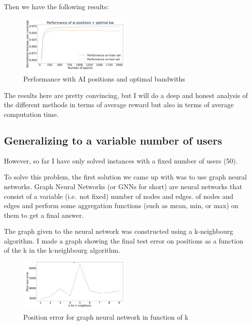 \documentclass[letterpaper]{article}
\begin{document}
Then we have the following results:

\begin{figure}[H]
    \centering
    \includegraphics[width=0.5\textwidth]{images/mix_results.png}
    \caption{Performance with AI positions and optimal bandwiths}
\end{figure}

The results here are pretty convincing, but I will do a deep and honest analysis of the different methods in terms
of average reward but also in terms of average computation time.

\subsection{Generalizing to a variable number of users}

However, so far I have only solved instances with a fixed number of users (50).

To solve this problem, the first solution we came up with was to use graph neural networks.
Graph Neural Networks (or GNNs for short) are neural networks that consist of a variable (i.e.\, not fixed) number of nodes and edges.
of nodes and edges and perform some aggregation functions (such as mean, min, or max) on them to get a final answer.

The graph given to the neural network was constructed using a k-neighbourg algorithm.
I made a graph showing the final test error on positions as a function of the k in the k-neighbourg algorithm.

\begin{figure}[H]
    \centering
    \includegraphics[width=0.5\textwidth]{images/knn_for_gnn.png}
    \caption{Position error for graph neural network in function of k}
\end{figure}
\end{document}

